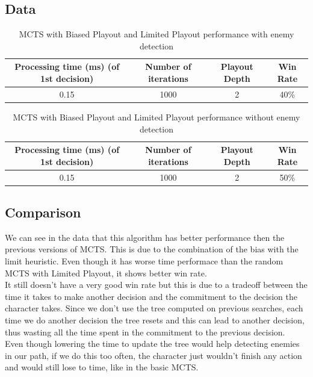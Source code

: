 \documentclass{article}
\begin{document}
  \subsection{Data}
  \begin{table}[h!]
    \centering
    \caption{MCTS with Biased Playout and Limited Playout performance with enemy detection}
    \label{tab:tableLimitedBiasedMCTS1}
    \begin{tabular}{c|c|c|c}
      \textbf{Processing time (ms) (of 1st decision)} & \textbf{Number of iterations} & \textbf{Playout Depth} & \textbf{Win Rate}\\
      \hline
      0.15 & 1000 & 2 & 40\%
    \end{tabular}
  \end{table}
  \begin{table}[h!]
    \centering
    \caption{MCTS with Biased Playout and Limited Playout performance without enemy detection}
    \label{tab:tableLimitedBiasedMCTS2}
    \begin{tabular}{c|c|c|c}
      \textbf{Processing time (ms) (of 1st decision)} & \textbf{Number of iterations} & \textbf{Playout Depth} & \textbf{Win Rate}\\
      \hline
      0.15 & 1000 & 2 & 50\%
    \end{tabular}
  \end{table}

  \subsection{Comparison}
  We can see in the data that this algorithm has better performance then the previous versions of MCTS. This is due to the combination of the bias with the limit heuristic.
  Even though it has worse time performace than the random MCTS with Limited Playout, it shows better win rate. \\
  It still doesn't have a very good win rate but this is due to a tradeoff between the time it takes to make another decision and the commitment to the decision the
  character takes. Since we don't use the tree computed on previous searches, each time we do another decision the tree resets and this can lead to another decision,
  thus wasting all the time spent in the commitment to the previous decision.\\ 
  Even though lowering the time to update the tree would help detecting enemies in our path, if we do this too often, the character just wouldn't finish any action 
  and would still lose to time, like in the basic MCTS.\\
\end{document}
